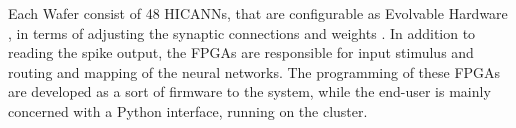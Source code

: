 Each Wafer consist of 48 HICANNs, that are configurable as Evolvable
Hardware \cite{evolvable_hardware}, in terms of adjusting the synaptic
connections and weights \cite{brainscales-1}. In addition to reading
the spike output, the FPGAs are responsible for input stimulus and
routing and mapping of the neural networks. The programming of these
FPGAs are developed as a sort of firmware to the system, while the
end-user is mainly concerned with a Python interface, running on the
cluster.



















